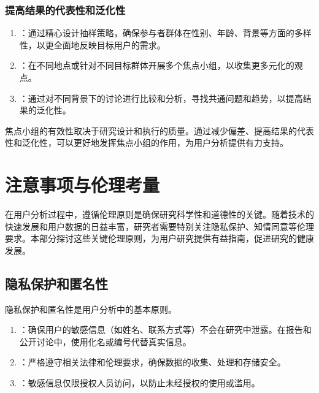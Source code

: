 \documentclass[letterpaper,10pt,english]{sphinxmanual}
\begin{document}
\subsubsection{提高结果的代表性和泛化性}
\label{\detokenize{user-research/focus-group:id38}}\begin{enumerate}
%
\item {} 
\sphinxAtStartPar
{}：通过精心设计抽样策略，确保参与者群体在性别、年龄、背景等方面的多样性，以更全面地反映目标用户的需求。

\item {} 
\sphinxAtStartPar
{}：在不同地点或针对不同目标群体开展多个焦点小组，以收集更多元化的观点。

\item {} 
\sphinxAtStartPar
{}：通过对不同背景下的讨论进行比较和分析，寻找共通问题和趋势，以提高结果的泛化性。

\end{enumerate}

\sphinxAtStartPar
焦点小组的有效性取决于研究设计和执行的质量。通过减少偏差、提高结果的代表性和泛化性，可以更好地发挥焦点小组的作用，为用户分析提供有力支持。


\section{注意事项与伦理考量}
\label{\detokenize{user-research/focus-group:id39}}
\sphinxAtStartPar
在用户分析过程中，遵循伦理原则是确保研究科学性和道德性的关键。随着技术的快速发展和用户数据的日益丰富，研究者需要特别关注隐私保护、知情同意等伦理要求。本部分探讨这些关键伦理原则，为用户研究提供有益指南，促进研究的健康发展。


\subsection{隐私保护和匿名性}
\label{\detokenize{user-research/focus-group:id40}}
\sphinxAtStartPar
隐私保护和匿名性是用户分析中的基本原则。
\begin{enumerate}
%
\item {} 
\sphinxAtStartPar
{}：确保用户的敏感信息（如姓名、联系方式等）不会在研究中泄露。在报告和公开讨论中，使用化名或编号代替真实信息。

\item {} 
\sphinxAtStartPar
{}：严格遵守相关法律和伦理要求，确保数据的收集、处理和存储安全。

\item {} 
\sphinxAtStartPar
{}：敏感信息仅限授权人员访问，以防止未经授权的使用或滥用。

\end{enumerate}
\end{document}
